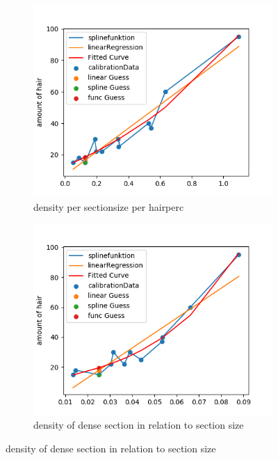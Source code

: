 \documentclass[german,a4paper, 12pt]{llncs}
\begin{document}
\begin{figure}[H]
\medskip
\begin{subfigure}{0.48\textwidth}
	\includegraphics[width=1.1\linewidth]{fig64/g03_densitynorm2.png}
	\caption{density per sectionsize per hairperc} \label{fig:c}
\end{subfigure}\hspace*{\fill}
\begin{subfigure}{0.48\textwidth}
	\includegraphics[width=1.1\linewidth]{fig64/g04_densityDenseSections.png}
	\caption{density of dense section in relation to section size} \label{fig:d}
\end{subfigure}


\end{figure}
\end{document}
